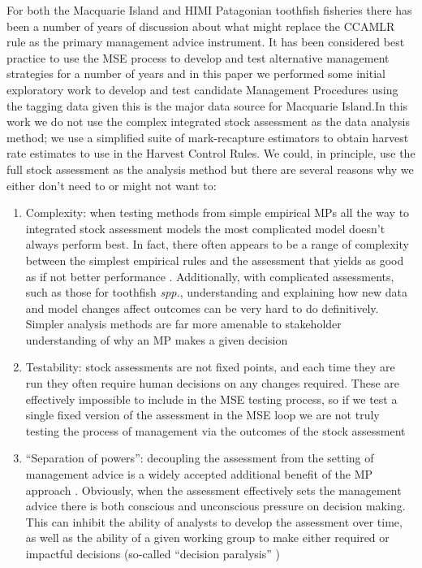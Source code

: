 \documentclass[12pt,a4paper,twoside,times,sky,standard]{csiroreport2017}
\begin{document}
For both the Macquarie Island and HIMI Patagonian toothfish fisheries there  has been a number of years of discussion about what might replace the CCAMLR rule as the primary management advice instrument. It has been considered best practice to use the MSE process to develop and test alternative management strategies for a number of years \cite{mse} and in this paper we performed some initial exploratory work to develop and test candidate Management Procedures using the tagging data given this is the major data source for Macquarie Island.In this work we do not use the complex integrated stock assessment as the data analysis method; we use a simplified suite of mark-recapture estimators to obtain harvest rate estimates to use in the Harvest Control Rules. We could, in principle, use the full stock assessment as the analysis method but there are several reasons why we either don't need to or might not want to:

\begin{enumerate}
    \item Complexity: when testing methods from simple empirical MPs all the way to integrated stock assessment models the most complicated model doesn't always perform best. In fact, there often appears to be a range of complexity between the simplest empirical rules and the assessment that yields as good as if not better performance \cite{mse,iwc,sbtmp,mprev}. Additionally, with complicated assessments, such as those for toothfish \textit{spp.}, understanding and explaining how new data and model changes affect outcomes can be very hard to do definitively. Simpler analysis methods are far more amenable to stakeholder understanding of why an MP makes a given decision
    \item Testability: stock assessments are not fixed points, and each time they are run they often require human decisions on any changes required. These are effectively impossible to include in the MSE testing process, so if we test a single fixed version of the assessment in the MSE loop we are not truly testing the process of management via the outcomes of the stock assessment
    \item ``Separation of powers'': decoupling the assessment from the setting of management advice is a widely accepted additional benefit of the MP approach \cite{iwc,sbtmp}. Obviously, when the assessment effectively sets the management advice there is both conscious and unconscious pressure on decision making. This can inhibit the ability of analysts to develop the assessment over time, as well as the ability of a given working group to make either required or impactful decisions (so-called ``decision paralysis'' \cite{sbtmp})
\end{enumerate}
\end{document}
